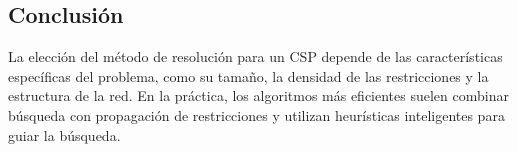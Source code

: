 \documentclass[12pt,a4paper]{report}
\begin{document}
\subsection{Conclusión}

La elección del método de resolución para un CSP depende de las características específicas del problema, como su tamaño, la densidad de las restricciones y la estructura de la red. En la práctica, los algoritmos más eficientes suelen combinar búsqueda con propagación de restricciones y utilizan heurísticas inteligentes para guiar la búsqueda.

\newpage



	
		
		
\end{document}
